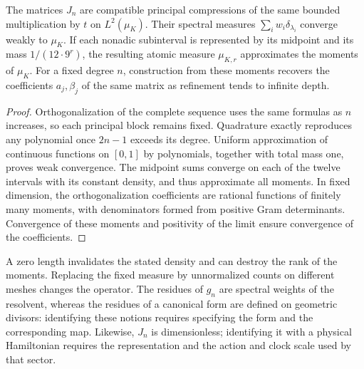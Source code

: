 \begin{proposition}
\label{prop:jacobi-refinement}
The matrices \(J_n\) are compatible principal compressions of the
same bounded multiplication by \(t\) on \(L^2(\mu_K)\). Their
spectral measures \(\sum_iw_i\delta_{\lambda_i}\) converge weakly
to \(\mu_K\). If each nonadic subinterval is represented by its
midpoint and its mass \(1/(12\cdot9^r)\), the resulting atomic
measure \(\mu_{K,r}\) approximates the moments of \(\mu_K\).
For a fixed degree \(n\), construction from these moments recovers
the coefficients \(a_j,\beta_j\) of the same matrix as refinement
tends to infinite depth.
\end{proposition}
\begin{proof}
Orthogonalization of the complete sequence uses the same formulas as
\(n\) increases, so each principal block remains fixed. Quadrature
exactly reproduces any polynomial once \(2n-1\) exceeds its degree.
Uniform approximation of continuous functions on \([0,1]\) by
polynomials, together with total mass one, proves weak convergence.
The midpoint sums converge on each of the twelve intervals with its
constant density, and thus approximate all moments. In fixed dimension,
the orthogonalization coefficients are rational functions of finitely
many moments, with denominators formed from positive Gram determinants.
Convergence of these moments and positivity of the limit ensure
convergence of the coefficients.
\end{proof}

\begin{falsifier}
A zero length invalidates the stated density and can destroy the rank
of the moments. Replacing the fixed measure by unnormalized counts on
different meshes changes the operator. The residues of \(g_n\) are
spectral weights of the resolvent, whereas the residues of a canonical
form are defined on geometric divisors: identifying these notions
requires specifying the form and the corresponding map. Likewise,
\(J_n\) is dimensionless; identifying it with a physical Hamiltonian
requires the representation and the action and clock scale used by
that sector.
\end{falsifier}

